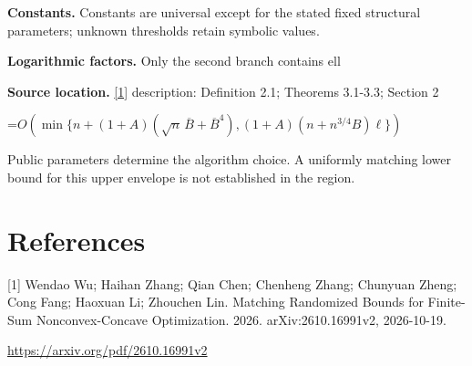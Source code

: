 \documentclass[10pt,a4paper]{article}
\newcommand{\AtlasMath}[1]{\par\begingroup\centering\setbox0=\hbox{$\displaystyle #1$}\ifdim\wd0>1.4\linewidth\typeout{ATLAS WIDE FORMULA: \the\wd0}\fi\ifdim\wd0>\linewidth\resizebox{\linewidth}{!}{\box0}\else\box0\fi\par\endgroup}
\begin{document}
\textbf{Constants.} Constants are universal except for the stated fixed structural parameters; unknown thresholds retain symbolic values.

\textbf{Logarithmic factors.} Only the second branch contains ell

\textbf{Source location.} \href{https://arxiv.org/pdf/2610.16991v2}{[1]} description: Definition 2.1; Theorems 3.1-3.3; Section 2

\AtlasMath{O\!\left(\min\{n+(1+A)(\sqrt n\,\overline B+\overline B^4),(1+A)(n+n^{3/4}B)\ell\}\right)}
Public parameters determine the algorithm choice. A uniformly matching lower bound for this upper envelope is not established in the region.

\section{References}
[1] Wendao Wu; Haihan Zhang; Qian Chen; Chenheng Zhang; Chunyuan Zheng; Cong Fang; Haoxuan Li; Zhouchen Lin. Matching Randomized Bounds for Finite-Sum Nonconvex-Concave Optimization. 2026. arXiv:2610.16991v2, 2026-10-19.

\url{https://arxiv.org/pdf/2610.16991v2}
\end{document}
